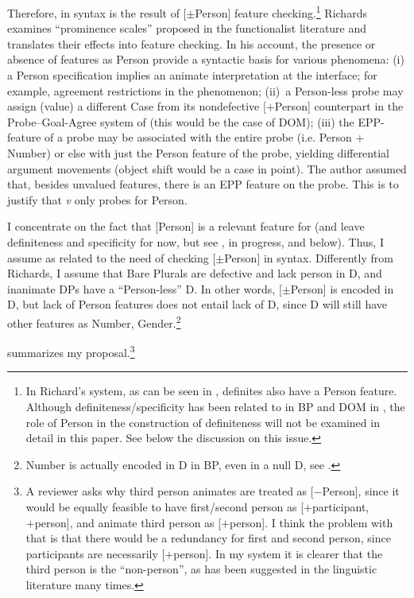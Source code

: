 \documentclass[output=paper]{langsci/langscibook}
\begin{document}
Therefore,  in syntax is the result of [$\pm$Person] feature
checking.\footnote{In Richard's system, as can be seen in ,
definites also have a Person feature. Although definiteness/specificity has
been related to  in \gls{BP} and DOM in , the role of Person in
the construction of definiteness will not be examined in detail in this paper.
See below the discussion on this issue.} Richards examines \enquote{prominence
scales} proposed in the functionalist literature and translates their effects
into feature checking. In his account, the presence or absence of features as
Person provide a syntactic basis for various phenomena: (i) a Person
specification implies an animate interpretation at the interface; for example,
agreement restrictions in the  phenomenon; (ii)~a
Person-less probe may assign (value) a different Case from its nondefective
[$+$Person] counterpart in the Probe--Goal-Agree system of \citealt{Chomsky2001}
(this would be the case of DOM); (iii) the \gls{EPP}-feature of a probe may be
associated with the entire probe (i.e. Person + Number) or else with just the
Person feature of the probe, yielding differential argument movements (object
shift would be a case in point).  The author assumed that, besides unvalued
features, there is an \gls{EPP} feature on the probe. This is to justify that
\emph{v} only probes for Person.

I concentrate on the fact that [Person] is a relevant feature for  (and
leave definiteness and specificity for now, but see \citealt{IrimiaCyrino2015},
in prog\-ress, and below). Thus, I assume  as related to the need of
checking [$\pm$Person] in syntax. Differently from Richards, I assume that Bare
Plurals are defective and lack person in D,  and inanimate DPs have a
\enquote{Person-less} D. In other words, [$\pm$Person] is encoded in D, but lack of
Person features does not entail lack of D, since D will still have other
features as Number, Gender.\footnote{Number is actually encoded in D in
\gls{BP}, even in a null D, see
\citet{CyrinoEspinal2015}.}

 summarizes my proposal.\footnote{A reviewer asks why
    third person animates are treated as [$-$Person], since it would be equally
    feasible to have first/second person as
    [$+$participant, +person], and animate third person as
    [$+$person].  I think the problem with that is that there would be a
    redundancy for first and second person, since
    participants are necessarily [$+$person]. In my system it is clearer that
    the third person is the \enquote{non-person}, as
has been suggested in the linguistic literature many times.}
\end{document}
